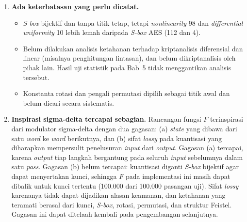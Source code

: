 \begin{enumerate}
  \item \textbf{Ada keterbatasan yang perlu dicatat.}
    \begin{itemize}
      \item \textit{S-box} bijektif dan tanpa titik tetap, tetapi \textit{nonlinearity} 98 dan
        \textit{differential uniformity} 10 lebih lemah daripada \textit{S-box} AES (112 dan 4).
      \item Belum dilakukan analisis ketahanan terhadap kriptanalisis diferensial dan linear
        (misalnya penghitungan lintasan), dan \algname{} belum dikriptanalisis oleh pihak lain.
        Hasil uji statistik pada Bab~5 tidak menggantikan analisis tersebut.
      \item Konstanta rotasi dan pengali permutasi dipilih sebagai titik awal dan belum dicari
        secara sistematis.
    \end{itemize}

  \item \textbf{Inspirasi sigma-delta tercapai sebagian.} Rancangan fungsi $F$ terinspirasi dari
    modulator sigma-delta dengan dua gagasan: (a) \textit{state} yang dibawa dari satu \textit{word}
    ke \textit{word} berikutnya, dan (b) sifat \textit{lossy} pada kuantisasi yang diharapkan
    mempersulit penelusuran \textit{input} dari \textit{output}. Gagasan (a) tercapai, karena
    \textit{output} tiap langkah bergantung pada seluruh \textit{input} sebelumnya dalam satu
    \textit{pass}. Gagasan (b) belum tercapai: kuantisasi diganti \textit{S-box} bijektif agar dapat
    menyertakan kunci, sehingga $F$ pada implementasi ini masih dapat dibalik untuk kunci tertentu
    (100.000 dari 100.000 pasangan uji). Sifat \textit{lossy} karenanya tidak dapat dijadikan
    alasan keamanan, dan ketahanan yang teramati berasal dari kunci, \textit{S-box}, rotasi,
    permutasi, dan struktur Feistel. Gagasan ini dapat ditelaah kembali pada pengembangan
    selanjutnya.
\end{enumerate}

